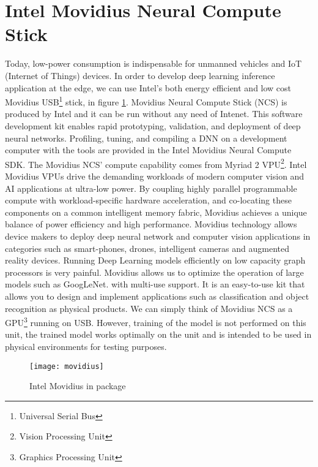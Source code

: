 \section{Intel Movidius Neural Compute Stick}
\label{sec:movidius}
Today, low-power consumption is indispensable for unmanned vehicles and IoT 
(Internet of Things) devices.
In order to develop deep learning inference application at the edge, we can use 
Intel’s both energy efficient and low cost Movidius 
USB\footnote{Universal Serial Bus} stick, in figure \ref{fig:movidius}.
Movidius Neural Compute Stick (NCS) is produced by Intel and it can be run 
without any need of Intenet. 
This software development kit enables rapid prototyping, validation, and 
deployment of deep neural networks. 
Profiling, tuning, and compiling a DNN on a development computer with the tools 
are provided in the Intel Movidius Neural Compute SDK.
The Movidius NCS’ compute capability comes from Myriad 2 VPU\footnote{Vision Processing Unit}.
Intel Movidius VPUs drive the demanding workloads of  modern computer vision 
and AI applications at ultra-low power. 
By coupling highly parallel programmable compute with workload-specific hardware 
acceleration, and co-locating these components on a common intelligent memory 
fabric, Movidius achieves a unique balance of power efficiency and high performance. 
Movidius technology allows device makers to deploy deep neural network and 
computer vision applications in categories such as smart-phones, drones, 
intelligent cameras and augmented reality devices.
Running Deep Learning models efficiently on low capacity graph processors is very painful. 
Movidius allows us to optimize the operation of large models such as GoogLeNet.
with multi-use support. It is an easy-to-use kit that allows you to design and 
implement applications such as classification and object recognition as physical 
products.
We can simply think of Movidius NCS as a GPU\footnote{Graphics Processing Unit} 
running on USB. 
However, training of the model is not performed on this unit, the trained model 
works optimally on the unit and is intended to be used in physical environments 
for testing purposes.
%
\begin{figure}[htb]
\centering
\texttt{[image: movidius]}
\caption{Intel Movidius in package}
\label{fig:movidius}
\end{figure}
%
